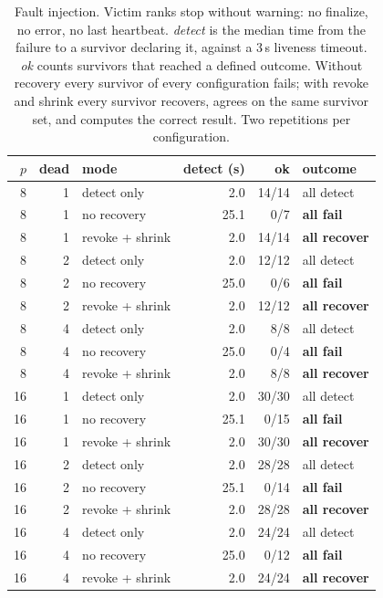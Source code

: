\begin{table}[t]
\centering\small
\caption{Fault injection. Victim ranks stop without warning: no finalize, no error, no last heartbeat. \emph{detect} is the median time from the failure to a survivor declaring it, against a 3\,s liveness timeout. \emph{ok} counts survivors that reached a defined outcome. Without recovery every survivor of every configuration fails; with revoke and shrink every survivor recovers, agrees on the same survivor set, and computes the correct result. Two repetitions per configuration.}
\label{tab:faults}
\begin{tabular}{@{}rrlrrl@{}}
\toprule
$p$ & \textbf{dead} & \textbf{mode} & \textbf{detect (s)} & \textbf{ok} & \textbf{outcome} \\
\midrule
8 & 1 & detect only & 2.0 & 14/14 & all detect \\
8 & 1 & no recovery & 25.1 & 0/7 & \textbf{all fail} \\
8 & 1 & revoke + shrink & 2.0 & 14/14 & \textbf{all recover} \\
8 & 2 & detect only & 2.0 & 12/12 & all detect \\
8 & 2 & no recovery & 25.0 & 0/6 & \textbf{all fail} \\
8 & 2 & revoke + shrink & 2.0 & 12/12 & \textbf{all recover} \\
8 & 4 & detect only & 2.0 & 8/8 & all detect \\
8 & 4 & no recovery & 25.0 & 0/4 & \textbf{all fail} \\
8 & 4 & revoke + shrink & 2.0 & 8/8 & \textbf{all recover} \\
16 & 1 & detect only & 2.0 & 30/30 & all detect \\
16 & 1 & no recovery & 25.1 & 0/15 & \textbf{all fail} \\
16 & 1 & revoke + shrink & 2.0 & 30/30 & \textbf{all recover} \\
16 & 2 & detect only & 2.0 & 28/28 & all detect \\
16 & 2 & no recovery & 25.1 & 0/14 & \textbf{all fail} \\
16 & 2 & revoke + shrink & 2.0 & 28/28 & \textbf{all recover} \\
16 & 4 & detect only & 2.0 & 24/24 & all detect \\
16 & 4 & no recovery & 25.0 & 0/12 & \textbf{all fail} \\
16 & 4 & revoke + shrink & 2.0 & 24/24 & \textbf{all recover} \\
\bottomrule
\end{tabular}
\end{table}
